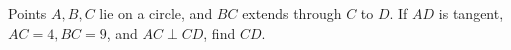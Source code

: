 Points $A,B,C$ lie on a circle, and $BC$ extends through $C$ to $D$. If $AD$ is tangent, $AC=4,BC=9$, and $AC\perp CD$, find $CD$.
